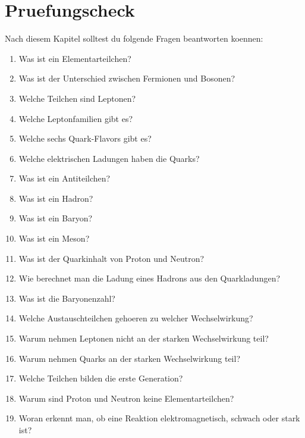 \section{Pruefungscheck}

\begin{examtipbox}
Nach diesem Kapitel solltest du folgende Fragen beantworten koennen:
\begin{enumerate}
    \item Was ist ein Elementarteilchen?
    \item Was ist der Unterschied zwischen Fermionen und Bosonen?
    \item Welche Teilchen sind Leptonen?
    \item Welche Leptonfamilien gibt es?
    \item Welche sechs Quark-Flavors gibt es?
    \item Welche elektrischen Ladungen haben die Quarks?
    \item Was ist ein Antiteilchen?
    \item Was ist ein Hadron?
    \item Was ist ein Baryon?
    \item Was ist ein Meson?
    \item Was ist der Quarkinhalt von Proton und Neutron?
    \item Wie berechnet man die Ladung eines Hadrons aus den Quarkladungen?
    \item Was ist die Baryonenzahl?
    \item Welche Austauschteilchen gehoeren zu welcher Wechselwirkung?
    \item Warum nehmen Leptonen nicht an der starken Wechselwirkung teil?
    \item Warum nehmen Quarks an der starken Wechselwirkung teil?
    \item Welche Teilchen bilden die erste Generation?
    \item Warum sind Proton und Neutron keine Elementarteilchen?
    \item Woran erkennt man, ob eine Reaktion elektromagnetisch, schwach oder stark ist?
\end{enumerate}
\end{examtipbox}
